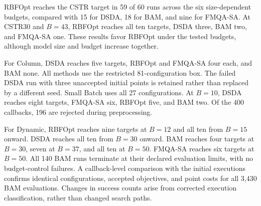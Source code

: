 \documentclass{article}
\begin{document}
RBFOpt reaches the CSTR target in 59 of 60 runs across the six size-dependent budgets, compared with 15 for DSDA, 18 for BAM, and nine for FMQA-SA.
At CSTR30 and $B=43$, RBFOpt reaches all ten targets, DSDA three, BAM two, and FMQA-SA one.
These results favor RBFOpt under the tested budgets, although model size and budget increase together.

For Column, DSDA reaches five targets, RBFOpt and FMQA-SA four each, and BAM none.
All methods use the restricted 81-configuration box. The failed DSDA run with three unaccepted initial points is retained rather than replaced by a different seed.
Small Batch uses all 27 configurations. At $B=10$, DSDA reaches eight targets, FMQA-SA six, RBFOpt five, and BAM two. Of the 400 callbacks, 196 are rejected during preprocessing.

For Dynamic, RBFOpt reaches nine targets at $B=12$ and all ten from $B=15$ onward. DSDA reaches all ten from $B=30$ onward.
BAM reaches four targets at $B=30$, seven at $B=37$, and all ten at $B=50$. FMQA-SA reaches six targets at $B=50$.
All 140 BAM runs terminate at their declared evaluation limits, with no budget-control failures. A callback-level comparison with the initial executions confirms identical configurations, accepted objectives, and point costs for all 3,430 BAM evaluations. Changes in success counts arise from corrected execution classification, rather than changed search paths.
\end{document}
